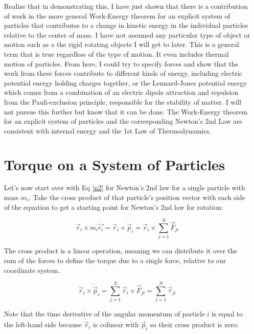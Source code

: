 \documentclass[10pt]{article}
\begin{document}
Realize that in demonstrating this, I have just shown that there is 
a contribution of work in the more general Work-Energy theorem for an explicit 
system of particles that contributes to a change in kinetic energy in the 
individual particles relative to the center of mass. I have not assumed 
any particular type of object or motion such as a the 
rigid rotating objects I will get to later. This is a general term 
that is true regardless of the type of motion. It even includes thermal 
motion of particles. From here, I could try to specify forces and 
show that the work from these forces contribute to different kinds of 
energy, including electric potential energy holding charges together, 
or the Lennard-Jones potential energy which comes from a combination of 
an electric dipole attraction and repulsion from the 
Pauli-exclusion principle, responsible for the stability of matter. I will 
not pursue this further but know that it can be done. The Work-Energy theorem 
for an explicit system of particles and the corresponding 
Newton's 2nd Law are consistent with internal 
energy and the 1st Law of Thermodynamics. 

\section{Torque on a System of Particles}

Let's now start over with Eq \ref{n2} for Newton's 2nd law for a single 
particle with mass $m_i$. Take the cross product of that particle's 
position vector with each side of the equation to get a starting point for 
Newton's 2nd law for rotation:

\begin{equation} \label{r2}
    \vec{r}_i\times m_i\ddot{\vec{r_i}} = \vec{r}_i\times \dot{\vec{p}}_i 
        = \vec{r}_i\times\sum_{j=1}^{N}\vec{F}_{ji}
\end{equation}

The cross product is a linear operation, meaning we can distribute it over the 
sum of the forces to define the torque due to a single force, relative 
to our coordinate system.

\begin{equation*}
    \vec{r}_i\times \dot{\vec{p}}_i = \sum_{j=1}^{N}\vec{r}_i\times\vec{F}_{ji} 
        = \sum_{j=1}^N\vec{\tau}_{ji}
\end{equation*}

Note that the time derivative of the angular momentum of particle $i$ is equal 
to the left-hand side because $\dot{\vec{r}}_i$ is colinear with $\vec{p}_i$ 
so their cross product is zero:
\end{document}
